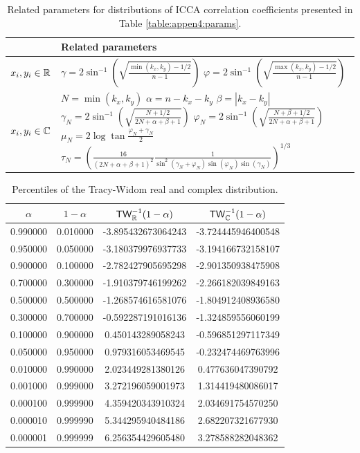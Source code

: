 \begin{table}[t]
\centering
\begin{tabular}{C|F}\toprule
& Related parameters\\
\midrule
$x_i,y_i\in\mathbb{R}$ & \\
\midrule
$x_i,y_i\in\mathbb{C}$ & \\
\bottomrule
\end{tabular}
\caption{Related parameters for distributions of ICCA correlation coefficients presented
  in Table \ref{table:appen4:params}.}
\label{table:appen4:params2}
\end{table}

\begin{table}[t]
\centering
\begin{tabular}{c|c|c|c}\toprule
$\alpha$ & $1-\alpha$ & ${\sf TW}_{\mathbb{R}}^{-1}(1-\alpha)$ & ${\sf TW}_{\mathbb{C}}^{-1}(1-\alpha)$\\
\midrule
0.990000&   0.010000&  -3.895432673064243&  -3.724445946400548\\
0.950000&   0.050000&  -3.180379976937733&  -3.194166732158107\\
0.900000&   0.100000&  -2.782427905695298&  -2.901350938475908\\
0.700000&   0.300000&  -1.910379746199262&  -2.266182039849163\\
0.500000&   0.500000&  -1.268574616581076&  -1.804912408936580\\
0.300000&   0.700000&  -0.592287191016136&  -1.324859556060199\\
0.100000&   0.900000&   0.450143289058243&  -0.596851297117349\\
0.050000&   0.950000&   0.979316053469545&  -0.232474469763996\\
0.010000&   0.990000&   2.023449281380126&   0.477636047390792\\
0.001000&   0.999000&   3.272196059001973&   1.314419480086017\\
0.000100&   0.999900&   4.359420343910324&   2.034691754570250\\
0.000010&   0.999990&   5.344295940484186&   2.682207321677930\\
0.000001&   0.999999&   6.256354429605480&   3.278588282048362\\
\bottomrule
\end{tabular}
\caption{Percentiles of the Tracy-Widom real and complex distribution.}
\label{table:tw_perc}
\end{table}


